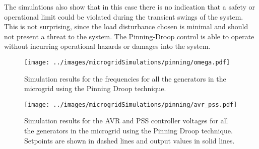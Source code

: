 	The simulations also show that in this case there is no indication that a safety or operational limit could be violated during the transient swings of the system. This is not surprising, since the load disturbance chosen is minimal and should not present a threat to the system. The Pinning-Droop control is able to operate without incurring operational hazards or damages into the system.

%

\begin{figure}[htb]
	\begin{center}
		\texttt{[image: ../images/microgridSimulations/pinning/omega.pdf]}
		\caption{Simulation results for the frequencies for all the generators in the microgrid using the Pinning Droop technique.}
		\label{fig:pinningOmegaP1}
	\end{center}
\end{figure}

\begin{figure}[htb]
	\begin{center}
		\texttt{[image: ../images/microgridSimulations/pinning/avr\_pss.pdf]}
		\caption{Simulation results for the AVR and PSS controller voltages for all the generators in the microgrid using the Pinning Droop technique. Setpoints are shown in dashed lines and output values in solid lines.}
		\label{fig:pinningAVRPSS}
	\end{center}
\end{figure}

